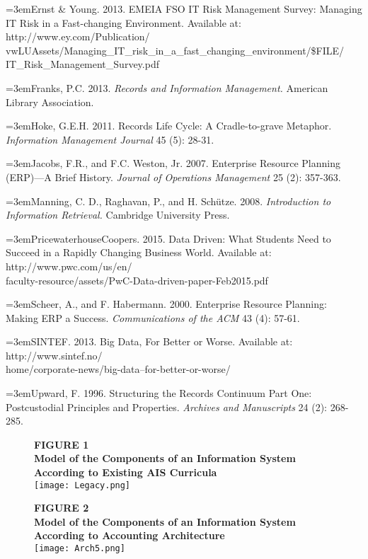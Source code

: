 \documentclass[12pt]{article}
\newcommand{\Reference}[1]{\parindent=0pt\hangindent=3em\hangafter=1#1\vspace{.15in}}
\begin{document}
\Reference{Ernst \& Young. 2013. EMEIA FSO IT Risk Management Survey: Managing IT Risk in a Fast-changing Environment. Available at: http://www.ey.com/Publication/\\vwLUAssets/Managing\_IT\_risk\_in\_a\_fast\_changing\_environment/\$FILE/\\IT\_Risk\_Management\_Survey.pdf}

\Reference{Franks, P.C. 2013. \emph{Records and Information Management.} American Library Association.}

\Reference{Hoke, G.E.H. 2011. Records Life Cycle: A Cradle-to-grave Metaphor. \emph{Information Management Journal} 45 (5): 28-31.}

\Reference{Jacobs, F.R., and F.C. Weston, Jr. 2007. Enterprise Resource Planning (ERP)---A Brief History. \emph{Journal of Operations Management} 25 (2): 357-363.}

\Reference{Manning, C. D., Raghavan, P., and H. Sch\"utze. 2008. \emph{Introduction to Information Retrieval.} Cambridge University Press.}

\Reference{PricewaterhouseCoopers. 2015. Data Driven: What Students Need to Succeed in a Rapidly Changing Business World. Available at: http://www.pwc.com/us/en/\\faculty-resource/assets/PwC-Data-driven-paper-Feb2015.pdf}

\Reference{Scheer, A., and F. Habermann. 2000. Enterprise Resource Planning: Making ERP a Success. \emph{Communications of the ACM} 43 (4): 57-61.}

\Reference{SINTEF. 2013. Big Data, For Better or Worse. Available at: http://www.sintef.no/\\home/corporate-news/big-data--for-better-or-worse/}

\Reference{Upward, F. 1996. Structuring the Records Continuum Part One: Postcustodial Principles and Properties. \emph{Archives and Manuscripts} 24 (2): 268-285.}

\newpage{}

\begin{figure}[!h]
\begin{center}
\textbf{\MakeUppercase{Figure 1}}\\[.2in]
\textbf{Model of the Components of an Information System According to Existing AIS Curricula}\\[.4in]
\texttt{[image: Legacy.png]}
\end{center}
\end{figure}
\newpage{}

\begin{figure}[!h]
\begin{center}
\textbf{\MakeUppercase{Figure 2}}\\[.2in]
\textbf{Model of the Components of an Information System According to Accounting Architecture}\\[.4in]
\texttt{[image: Arch5.png]}
\end{center}
\end{figure}
\end{document}
